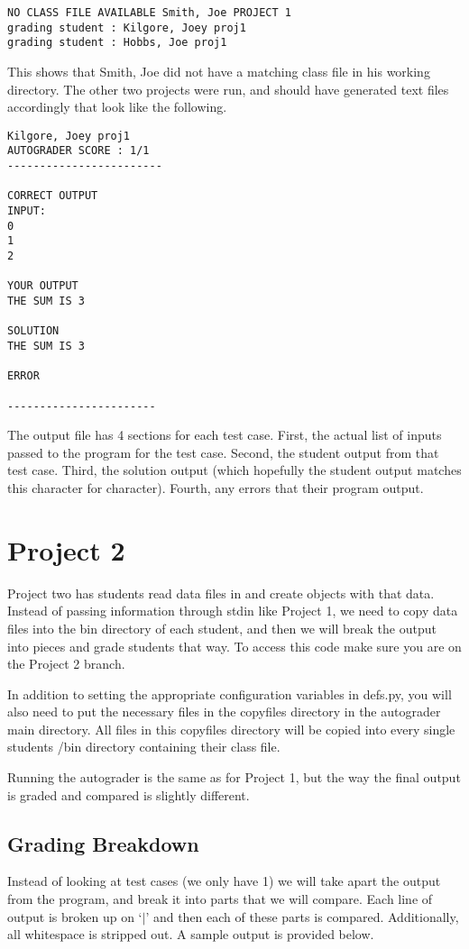 \documentclass[10pt,a4paper]{book}
\begin{document}
\begin{verbatim}
NO CLASS FILE AVAILABLE Smith, Joe PROJECT 1
grading student : Kilgore, Joey proj1
grading student : Hobbs, Joe proj1
\end{verbatim}

This shows that Smith, Joe did not have a matching class file in his working directory. The other two projects were run, and should have generated text files accordingly that look like the following.

\begin{verbatim}
Kilgore, Joey proj1
AUTOGRADER SCORE : 1/1
------------------------

CORRECT OUTPUT
INPUT:
0
1
2

YOUR OUTPUT
THE SUM IS 3

SOLUTION
THE SUM IS 3

ERROR

-----------------------
\end{verbatim}

The output file has 4 sections for each test case. First, the actual list of inputs passed to the program for the test case. Second, the student output from that test case. Third, the solution output (which hopefully the student output matches this character for character). Fourth, any errors that their program output. 

\chapter{Project 2}
Project two has students read data files in and create objects with that data. Instead of passing information through stdin like Project 1, we need to copy data files into the bin directory of each student, and then we will break the output into pieces and grade students that way. To access this code make sure you are on the Project 2 branch.

In addition to setting the appropriate configuration variables in defs.py, you will also need to put the necessary files in the copyfiles directory in the autograder main directory. All files in this copyfiles directory will be copied into every single students /bin directory containing their class file.

Running the autograder is the same as for Project 1, but the way the final output is graded and compared is slightly different. 

\section{Grading Breakdown}
Instead of looking at test cases (we only have 1) we will take apart the output from the program, and break it into parts that we will compare. Each line of output is broken up on `$\vert$' and then each of these parts is compared. Additionally, all whitespace is stripped out. A sample output is provided below.
\end{document}

